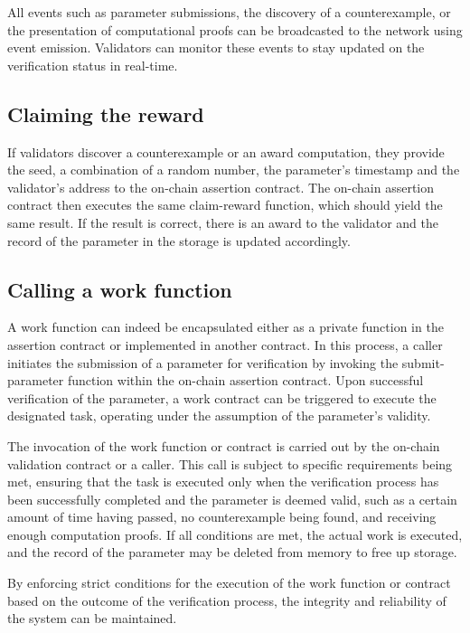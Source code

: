 \documentclass[runningheads]{llncs}
\begin{document}
All events such as parameter submissions, the discovery of a counterexample, or the presentation of computational proofs can be broadcasted to the network using event emission. Validators can monitor these events to stay updated on the verification status in real-time. 

\subsection{Claiming the reward} 
If validators discover a counterexample or an award computation, they provide the seed, a combination of a random number, the parameter's timestamp and the validator's address to the on-chain assertion contract. The on-chain assertion contract then executes the same claim-reward function, which should yield the same result.  If the result is correct, there is an award to the validator and the record of the parameter in the storage is updated accordingly. %


\subsection{Calling a work function}
A work function can indeed be encapsulated either as a private function in the assertion contract or implemented in another contract. In this process, a caller initiates the submission of a parameter for verification by invoking the submit-parameter function within the on-chain assertion contract. Upon successful verification of the parameter, a work contract can be triggered to execute the designated task, operating under the assumption of the parameter's validity.

The invocation of the work function or contract is carried out by the on-chain validation contract or a caller. This call is subject to specific requirements being met, ensuring that the task is executed only when the verification process has been successfully completed and the parameter is deemed valid, such as a certain amount of time having passed, no counterexample being found, and receiving enough computation proofs. If all conditions are met, the actual work is executed, and the record of the parameter may be deleted from memory to free up storage.

By enforcing strict conditions for the execution of the work function or contract based on the outcome of the verification process, the integrity and reliability of the system can be maintained.
\end{document}
